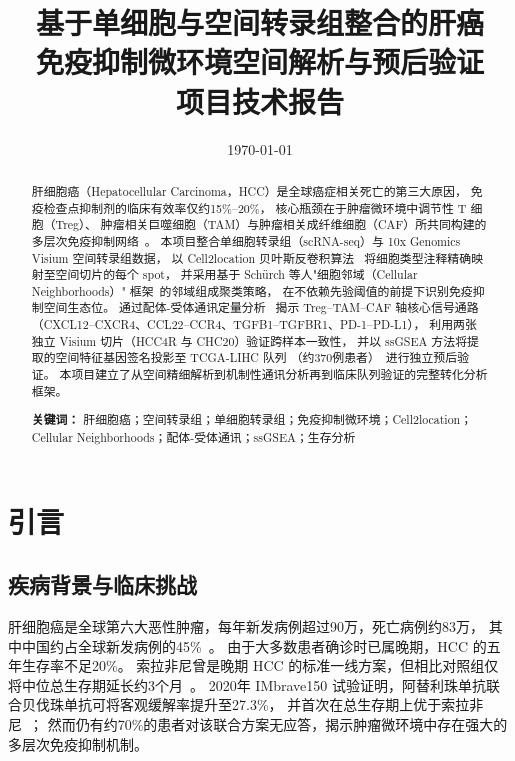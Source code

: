 \documentclass[12pt, a4paper]{ctexart}
\title{
    \vspace{-1cm}
    \textbf{基于单细胞与空间转录组整合的肝癌\\
    免疫抑制微环境空间解析与预后验证}\\[0.5em]
    \large 项目技术报告
}
\author{}
\date{\today}
\begin{document}
\maketitle
\thispagestyle{empty}

\begin{abstract}
肝细胞癌（Hepatocellular Carcinoma，HCC）是全球癌症相关死亡的第三大原因，
免疫检查点抑制剂的临床有效率仅约15\%--20\%，
核心瓶颈在于肿瘤微环境中调节性 T 细胞（Treg）、
肿瘤相关巨噬细胞（TAM）与肿瘤相关成纤维细胞（CAF）所共同构建的多层次免疫抑制网络~\citep{llovet2021hepatocellular,finn2020atezolizumab}。
本项目整合单细胞转录组（scRNA-seq）与 10x Genomics Visium 空间转录组数据，
以 Cell2location 贝叶斯反卷积算法~\citep{kleshchevnikov2022cell2location}
将细胞类型注释精确映射至空间切片的每个 spot，
并采用基于 Schürch 等人"细胞邻域（Cellular Neighborhoods）"
框架~\citep{schurch2020coordinated}的邻域组成聚类策略，
在不依赖先验阈值的前提下识别免疫抑制空间生态位。
通过配体-受体通讯定量分析~\citep{efremova2020cellphonedb}
揭示 Treg--TAM--CAF 轴核心信号通路（CXCL12--CXCR4、CCL22--CCR4、TGFB1--TGFBR1、PD-1--PD-L1），
利用两张独立 Visium 切片（HCC4R 与 CHC20）验证跨样本一致性，
并以 ssGSEA 方法将提取的空间特征基因签名投影至 TCGA-LIHC 队列
（约370例患者）~\citep{tomczak2015cancer}进行独立预后验证。
本项目建立了从空间精细解析到机制性通讯分析再到临床队列验证的完整转化分析框架。

\noindent\textbf{关键词：}
肝细胞癌；空间转录组；单细胞转录组；免疫抑制微环境；Cell2location；
Cellular Neighborhoods；配体-受体通讯；ssGSEA；生存分析
\end{abstract}

\newpage
\tableofcontents
\newpage


\section{引言}

\subsection{疾病背景与临床挑战}

肝细胞癌是全球第六大恶性肿瘤，每年新发病例超过90万，死亡病例约83万，
其中中国约占全球新发病例的45\%~\citep{llovet2021hepatocellular,chen2021liver}。
由于大多数患者确诊时已属晚期，HCC 的五年生存率不足20\%。
索拉非尼曾是晚期 HCC 的标准一线方案，但相比对照组仅将中位总生存期延长约3个月~\citep{llovet2008sorafenib}。
2020年 IMbrave150 试验证明，阿替利珠单抗联合贝伐珠单抗可将客观缓解率提升至27.3\%，
并首次在总生存期上优于索拉非尼~\citep{finn2020atezolizumab}；
然而仍有约70\%的患者对该联合方案无应答，揭示肿瘤微环境中存在强大的多层次免疫抑制机制。
\end{document}
